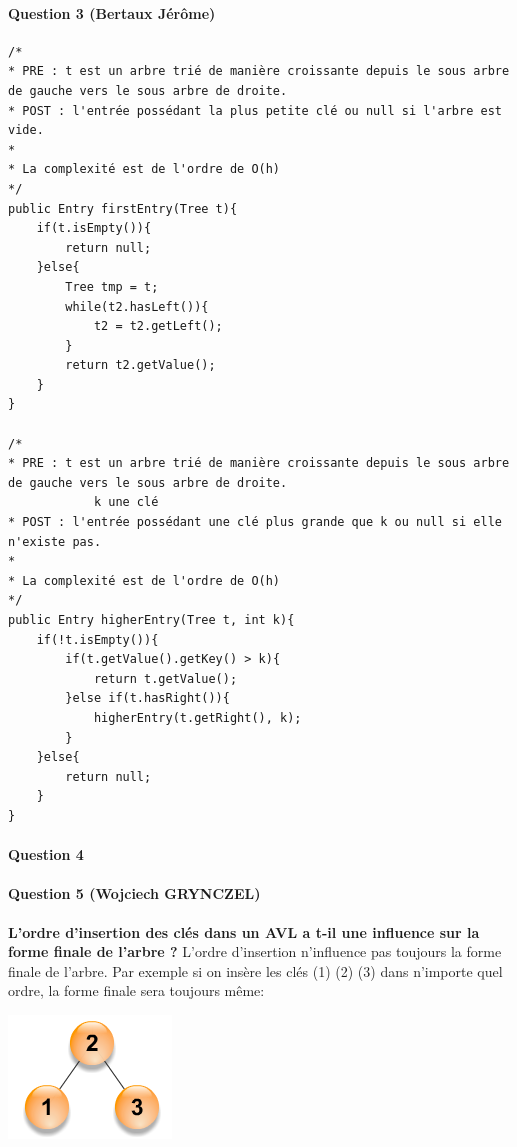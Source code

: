 \documentclass[a4paper]{article}
\begin{document}
\paragraph*{Question 3 (Bertaux Jérôme)}
\begin{verbatim}
/*
* PRE : t est un arbre trié de manière croissante depuis le sous arbre de gauche vers le sous arbre de droite.
* POST : l'entrée possédant la plus petite clé ou null si l'arbre est vide.
* 
* La complexité est de l'ordre de O(h)
*/
public Entry firstEntry(Tree t){
	if(t.isEmpty()){
		return null;
	}else{
		Tree tmp = t;
		while(t2.hasLeft()){
			t2 = t2.getLeft();		
		}
		return t2.getValue();	
	}
}

/*
* PRE : t est un arbre trié de manière croissante depuis le sous arbre de gauche vers le sous arbre de droite.
			k une clé
* POST : l'entrée possédant une clé plus grande que k ou null si elle n'existe pas.
* 
* La complexité est de l'ordre de O(h)
*/
public Entry higherEntry(Tree t, int k){
	if(!t.isEmpty()){
		if(t.getValue().getKey() > k){
			return t.getValue();		
		}else if(t.hasRight()){
			higherEntry(t.getRight(), k);		
		}	
	}else{
		return null;	
	}
}
\end{verbatim}

\paragraph*{Question 4}
\newpage
\paragraph*{Question 5 (Wojciech GRYNCZEL)\\}
\textbf{L’ordre d’insertion des clés dans un AVL a t-il une influence sur la forme finale de l’arbre ?}
L’ordre d’insertion n’influence pas toujours la forme finale de l’arbre. Par exemple si on insère  les clés  (1) (2) (3) dans n’importe quel ordre, la forme finale sera toujours même: \\
\begin{center}
\includegraphics{tree1}
\end{center}
\end{document}
